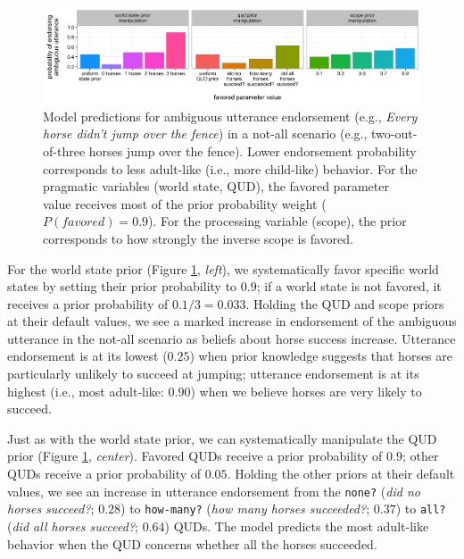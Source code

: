 \documentclass[10pt,a4paper]{article}
\begin{document}
\begin{figure}[ht]
\centering
\includegraphics[width = \textwidth]{fig2.jpg}
\vspace{-15pt}
\caption{Model predictions for ambiguous utterance endorsement (e.g., \emph{Every horse didn't jump over the fence}) in a not-all scenario (e.g., two-out-of-three horses jump over the fence). Lower endorsement probability corresponds to less adult-like (i.e., more child-like) behavior. For the pragmatic variables (world state, QUD), the favored parameter value receives most of the prior probability weight ($P(favored) = 0.9$). For the processing variable (scope), the prior corresponds to how strongly the inverse scope is favored.}
\label{fig:graphs}
\end{figure}

For the world state prior (Figure \ref{fig:graphs}, \emph{left}), we systematically favor specific world states by setting their prior probability to $0.9$; if a world state is not favored, it receives a prior probability of $0.1/3=0.033$. Holding the QUD and scope priors at their default values, we see a marked increase in endorsement of the ambiguous utterance in the not-all scenario as beliefs about horse success increase. Utterance endorsement is at its lowest ($0.25$) when prior knowledge suggests that horses are particularly unlikely to succeed at jumping; utterance endorsement is at its highest (i.e., most adult-like: $0.90$) when we believe horses are very likely to succeed.

Just as with the world state prior, we can systematically manipulate the QUD prior (Figure \ref{fig:graphs}, \emph{center}).  Favored QUDs receive a prior probability of $0.9$; other QUDs receive a prior probability of $0.05$. Holding the other priors at their default values, we see an increase in utterance endorsement from the \texttt{none?} (\emph{did no horses succeed?}; $0.28$) to \texttt{how-many?} (\emph{how many horses succeeded?}; $0.37$) to \texttt{all?} (\emph{did all horses succeed?}; $0.64$) QUDs. 
The model predicts the most adult-like behavior when the QUD concerns whether all the horses succeeded. 
\end{document}
